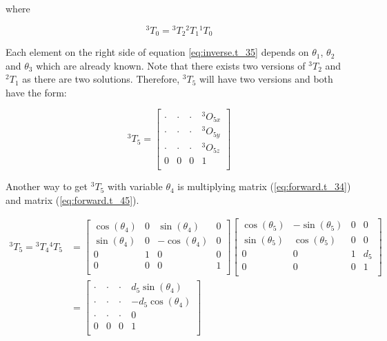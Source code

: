 \documentclass{article}
\renewcommand{\c}[1]{\cos(\theta_{#1})}
\newcommand{\s}[1]{\sin(\theta_{#1})}
\newcommand{\T}[2]{{}^{#1}T_{#2}}
\renewcommand{\O}[2]{{}^{#1}O_{#2}}
\begin{document}
where

\begin{equation}
\label{eq:inverse.t_30}
\T{3}{0} = \T{3}{2}\T{2}{1}\T{1}{0} 
\end{equation}

Each element on the right side of equation \ref{eq:inverse.t_35} depends on $\theta_1$, $\theta_2$ and $\theta_3$ which are already known. Note that there exists two versions of $\T{3}{2}$ and $\T{2}{1}$ as there are two solutions. Therefore, $\T{3}{5}$ will have two versions and both have the form:

\begin{equation}
\label{eq:inverse.t_35_expanded}
\T{3}{5}= \left[
\begin{array}{cccc}
	\cdot & \cdot & \cdot & \O{3}{5x} \\
	\cdot & \cdot & \cdot & \O{3}{5y} \\
	\cdot & \cdot & \cdot & \O{3}{5z} \\
    0 & 0 & 0 & 1 \\
\end{array}
\right] 
\end{equation}

Another way to get $\T{3}{5}$ with variable $\theta_4$ is multiplying matrix (\ref{eq:forward.t_34}) and matrix (\ref{eq:forward.t_45}).

\begin{equation}
\begin{aligned}
\label{eq:inverse.t_35_forward}
\T{3}{5} = \T{3}{4} \T{4}{5} & =
\left[
\begin{array}{cccc}
	\c{4} & 0 & \s{4} & 0 \\
	\s{4} & 0 & -\c{4} & 0 \\
	0 & 1 & 0 & 0 \\
	0 & 0 & 0 & 1 \\
\end{array}
\right] \left[
\begin{array}{cccc}
	\c{5} & -\s{5} & 0 & 0 \\
	\s{5} & \c{5} & 0 & 0  \\
	0 & 0 & 1 & d_5\\
	0 & 0 & 0 & 1 \\
\end{array}
\right] \\
& = \left[
\begin{array}{cccc}
	\cdot & \cdot & \cdot & d_5\s{4} \\
	\cdot & \cdot & \cdot & -d_5\c{4}\\
	\cdot & \cdot & \cdot & 0\\
    0 & 0 & 0 & 1 \\
\end{array}
\right] 
\end{aligned}
\end{equation}
\end{document}
